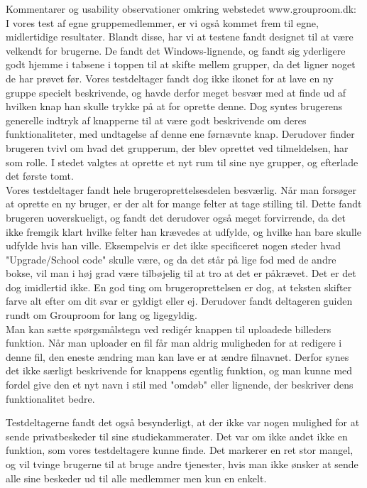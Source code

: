 \documentclass[12pt]{article}
\begin{document}
\noindent Kommentarer og usability observationer omkring webstedet www.grouproom.dk:\\

\noindent I vores test af egne gruppemedlemmer, er vi også kommet frem til egne, midlertidige resultater. Blandt disse, har vi at testene fandt designet til at være velkendt for brugerne. De fandt det Windows-lignende, og fandt sig yderligere godt hjemme i tabsene i toppen til at skifte mellem grupper, da det ligner noget de har prøvet før. Vores testdeltager fandt dog ikke ikonet for at lave en ny gruppe specielt beskrivende, og havde derfor meget besvær med at finde ud af hvilken knap han skulle trykke på at for oprette denne. Dog syntes brugerens generelle indtryk af knapperne til at være godt beskrivende om deres funktionaliteter, med undtagelse af denne ene førnævnte knap. Derudover finder brugeren tvivl om hvad det grupperum, der blev oprettet ved tilmeldelsen, har som rolle. I stedet valgtes at oprette et nyt rum til sine nye grupper, og efterlade det første tomt.\\

\noindent Vores testdeltager fandt hele brugeroprettelsesdelen besværlig. Når man forsøger at oprette en ny bruger, er der alt for mange felter at tage stilling til. Dette fandt brugeren uoverskueligt, og fandt det derudover også meget forvirrende, da det ikke fremgik klart hvilke felter han krævedes at udfylde, og hvilke han bare skulle udfylde hvis han ville. Eksempelvis er det ikke specificeret nogen steder hvad "Upgrade/School code" skulle være, og da det står på lige fod med de andre bokse, vil man i høj grad være tilbøjelig til at tro at det er påkrævet. Det er det dog imidlertid ikke. En god ting om brugeroprettelsen er dog, at teksten skifter farve alt efter om dit svar er gyldigt eller ej. Derudover fandt deltageren guiden rundt om 
Grouproom for lang og ligegyldig.\\

\noindent Man kan sætte spørgsmålstegn ved redigér knappen til uploadede billeders funktion. Når man uploader en fil får man aldrig muligheden for at redigere i denne fil, den eneste ændring man kan lave er at ændre filnavnet. Derfor synes det ikke særligt beskrivende for knappens egentlig funktion, og man kunne med fordel give den et nyt navn i stil med "omdøb" eller lignende, der beskriver dens funktionalitet bedre.\\

\newpage

\noindent Testdeltagerne fandt det også besynderligt, at der ikke var nogen mulighed for at sende privatbeskeder til sine studiekammerater. Det var om ikke andet ikke en funktion, som vores testdeltagere kunne finde. Det markerer en ret stor mangel, og vil tvinge brugerne til at bruge andre tjenester, hvis man ikke ønsker at sende alle sine beskeder ud til alle medlemmer men kun en enkelt.\\
\end{document}
